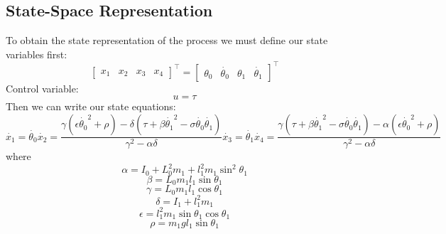 \subsection{State-Space Representation}
To obtain the state representation of the process we must define our state variables first:
\begin{equation}
	\begin{bmatrix}
	x_1 & x_2 & x_3 & x_4
	\end{bmatrix}^\intercal = 
	\begin{bmatrix}
	\theta_0 & \dot{\theta_0} & \theta_1 & \dot{\theta_1}
	\end{bmatrix}^\intercal
\end{equation}
Control variable:
\begin{equation} u = \tau \end{equation}
Then we can write our state equations:
\begin{subequations}
\begin{equation}\dot{x_1} = \dot{\theta_0} \end{equation}
\begin{equation}\dot{x_2} = \frac{\gamma(\epsilon\dot{\theta_0}^2+\rho)-\delta(\tau+\beta\dot{\theta_1}^2-\sigma\dot{\theta_0}\dot{\theta_1})}{\gamma^2-\alpha\delta}\end{equation}
\begin{equation}\dot{x_3} = \dot{\theta_1}\end{equation}
\begin{equation}\dot{x_4} = \frac{\gamma(\tau+\beta\dot{\theta_1}^2-\sigma\dot{\theta_0}\dot{\theta_1})-\alpha(\epsilon\dot{\theta_0}^2+\rho)}{\gamma^2-\alpha\delta}\end{equation}
\end{subequations}
where
\begin{equation}\alpha = I_0+L_0^2m_1+l_1^2m_1\sin^2\theta_1\end{equation}
\begin{equation}\beta = L_0m_1l_1\sin\theta_1 \end{equation}
\begin{equation}\gamma = L_0m_1l_1\cos\theta_1\end{equation}
\begin{equation}\delta = I_1+l_1^2m_1\end{equation}
\begin{equation}\epsilon = l^2_1m_1\sin\theta_1\cos\theta_1\end{equation}
\begin{equation}\rho = m_1gl_1\sin\theta_1\end{equation}
